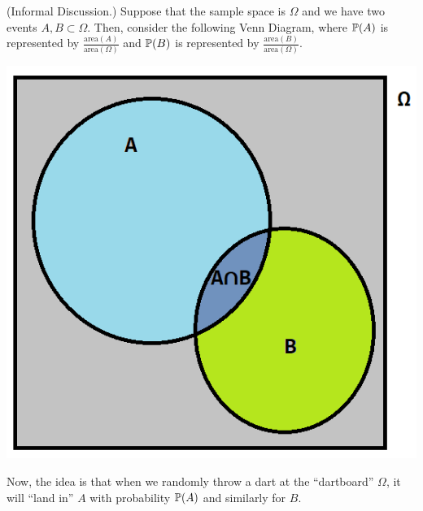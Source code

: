 \documentclass[letterpaper]{article}
\begin{document}
\begin{mdframed}[]
    (Informal Discussion.) Suppose that the sample space is $\Omega$ and we have two events $A, B \subset \Omega$. Then, consider the following Venn Diagram, where $\mathbb{P}(A)$ is represented by $\frac{\text{area}(A)}{\text{area}(\Omega)}$ and $\mathbb{P}(B)$ is represented by $\frac{\text{area}(B)}{\text{area}(\Omega)}$. 
    \begin{center}
        \includegraphics[scale=0.7]{../assets/venn1.png}
    \end{center}
    Now, the idea is that when we randomly throw a dart at the ``dartboard'' $\Omega$, it will ``land in'' $A$ with probability $\mathbb{P}(A)$ and similarly for $B$. 
    
    \bigskip 
    

\end{mdframed}
\end{document}
